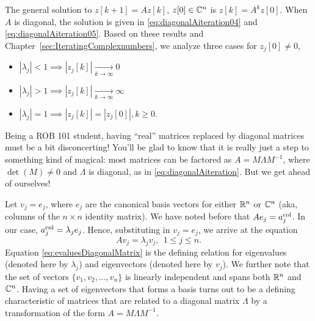 \vspace*{0.2cm} 
\begin{tcolorbox}
[title=\textbf{Linear Difference Equation with a Diagonal Matrix}]
The general solution to $z[k+1]= A z[k]$, $z[0]\in \mathbb C^n$ is $z[k] = A^k z[0]$. When $A$ is diagonal, the solution is given in \eqref{eq:diagonalAiteration04} and \eqref{eq:diagonalAiteration05}. Based on these results and Chapter~\ref{sec:IteratingComplexnumbers}, we analyze three cases for $z_j[0] \neq 0$,
\begin{itemize}
    \item $|\lambda_j|<1 \implies |z_j[k]| \underset{k \to \infty}{\longrightarrow} 0$
    \item $|\lambda_j|>1 \implies |z_j[k]| \underset{k \to \infty}{\longrightarrow} \infty$
 \item $|\lambda_j|=1 \implies |z_j[k]|=|z_j[0]|, k \ge 0$.
\end{itemize}
\end{tcolorbox}

Being a ROB 101 student, having ``real'' matrices replaced by diagonal matrices must be a bit disconcerting! You'll be glad to know that it is really just a step to something kind of magical: most matrices can be factored as $A = M \Lambda M^{-1}$, where $\det(M)\neq 0$ and $\Lambda$ is diagonal, as in \eqref{eq:diagonalAiteration}. But we get ahead of ourselves!\\


\vspace*{0.2cm}

\begin{tcolorbox}[title = \textbf{Key features of a Diagonal Matrix: One way that Eigenvalues and Eigenvectors come about}]
Let $v_j = e_j$, where $e_j$ are the canonical basis vectors for either  $\mathbb R^n$ or $\mathbb C^n$ (aka, columns of the $n \times n$ identity matrix). We have noted before that $A e_j = a_j^{\rm col}$. In our case, $ a_j^{\rm col} = \lambda_j e_j$. Hence, substituting in $v_j = e_j$, we arrive at the equation
\begin{equation}
    \label{eq:evaluesDiagonalMatrix}
    \boxed{
A v_j =\lambda_j v_j,~~1\le j \le n.}
\end{equation}
Equation \eqref{eq:evaluesDiagonalMatrix} is the defining relation for eigenvalues (denoted here by $\lambda_j$) and eigenvectors (denoted here by $v_j$). We further note that the set of vectors
$\{ v_1, v_2, \ldots, v_n\} $
is linearly independent and spans both $\mathbb R^n$ and $\mathbb C^n$. Having a set of eigenvectors that forms a basis turns out to be a defining characteristic of matrices that are related to a diagonal matrix $\Lambda$ by a transformation of the form  $A = M \Lambda M^{-1}$.\\
\end{tcolorbox}

